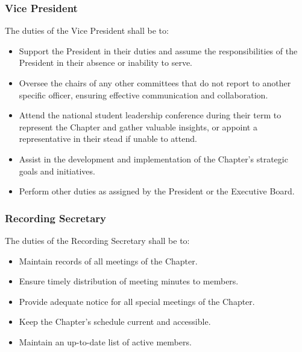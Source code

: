 \documentclass[10pt, oneside]{article}
\begin{document}
\subsubsection{Vice President}
The duties of the Vice President shall be to:
\begin{itemize}
    \item Support the President in their duties and assume the responsibilities of the President in their absence or inability to serve.
    \item Oversee the chairs of any other committees that do not report to another specific officer, ensuring effective communication and collaboration.
    \item Attend the national student leadership conference during their term to represent the Chapter and gather valuable insights, or appoint a representative in their stead if unable to attend.
    \item Assist in the development and implementation of the Chapter's strategic goals and initiatives.
    \item Perform other duties as assigned by the President or the Executive Board.
\end{itemize}
\subsubsection{Recording Secretary}
The duties of the Recording Secretary shall be to:
\begin{itemize}
    \item Maintain records of all meetings of the Chapter.
    \item Ensure timely distribution of meeting minutes to members.
    \item Provide adequate notice for all special meetings of the Chapter.
    \item Keep the Chapter's schedule current and accessible.
    \item Maintain an up-to-date list of active members.
\end{itemize}
\end{document}
